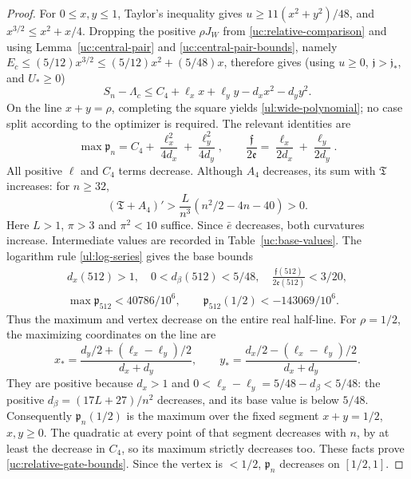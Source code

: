 \begin{proof}
For $0\leq x,y\leq1$, Taylor's inequality gives
$u\geq11(x^2+y^2)/48$, and
$x^{3/2}\leq x^2+x/4$. Dropping the positive $\rho J_W$ from
\eqref{uc:relative-comparison} and using Lemma~\ref{uc:central-pair}
and \eqref{uc:central-pair-bounds}, namely
$E_c\leq(5/12)x^{3/2}\leq(5/12)x^2+(5/48)x$,
therefore gives (using $u\geq0$, $\mathfrak j>\mathfrak j_*$, and $U_*\geq0$)
\[
 S_n-\Lambda_c\leq C_4+\ell_xx+\ell_yy-d_xx^2-d_yy^2.
\]
On the line $x+y=\rho$, completing the square yields
\eqref{ul:wide-polynomial}; no case split according to the optimizer
is required. The relevant identities are
\[
 \max \mathfrak p_n=C_4+\frac{\ell_x^2}{4d_x}+\frac{\ell_y^2}{4d_y},\qquad
 \frac{\mathfrak f}{2\mathfrak e}
       =\frac{\ell_x}{2d_x}+\frac{\ell_y}{2d_y}.
\]
All positive $\ell$ and $C_4$ terms decrease. Although $A_4$ decreases,
its sum with $\mathfrak T$ increases: for $n\geq32$,
\[
 (\mathfrak T+A_4)' >\frac{L}{n^3}(n^2/2-4n-40)>0.
\]
Here $L>1$, $\pi>3$ and $\pi^2<10$ suffice. Since $\bar e$
decreases, both curvatures increase. Intermediate values are recorded in
Table~\ref{uc:base-values}. The logarithm rule
\eqref{ul:log-series} gives the base bounds
\[
 \begin{gathered}
 d_x(512)>1,\quad 0<d_\beta(512)<5/48,\quad
 \frac{\mathfrak f(512)}{2\mathfrak e(512)}<3/20,\\
 \max \mathfrak p_{512}<40786/10^6,\qquad \mathfrak p_{512}(1/2)<-143069/10^6.
 \end{gathered}
\]
Thus the maximum and vertex decrease on the entire real half-line.
For $\rho=1/2$, the maximizing coordinates on the line are
\[
 x_* =\frac{d_y/2+(\ell_x-\ell_y)/2}{d_x+d_y},\qquad
 y_* =\frac{d_x/2-(\ell_x-\ell_y)/2}{d_x+d_y}.
\]
They are positive because $d_x>1$ and
$0<\ell_x-\ell_y=5/48-d_\beta<5/48$: the positive
$d_\beta=(17L+27)/n^2$ decreases, and its base value is below $5/48$.
Consequently $\mathfrak p_n(1/2)$ is the maximum over the fixed segment
$x+y=1/2$, $x,y\geq0$. The quadratic at every point of that segment
decreases with $n$, by at least the decrease in $C_4$, so its maximum
strictly decreases too. These facts prove \eqref{uc:relative-gate-bounds}.
Since the vertex is $<1/2$, $\mathfrak p_n$ decreases on $[1/2,1]$.
\end{proof}

